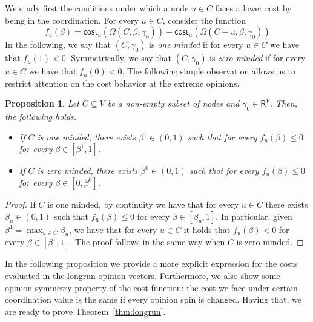 \documentclass[letterpaper,11pt]{article}
\newcommand{\RR}{\mathsf{R}}
\newcommand{\cost}{\mathsf{cost}}
\newtheorem{proposition}{Proposition}
\begin{document}
We study first the conditions under which a node $u\in C$ faces a lower cost by being in the coordination.
For every $u\in C$, consider the function 
\begin{equation*}
f_u(\beta)=\cost_u(\Omega(C,\beta,\gamma_0))- \cost_u(\Omega(C-u,\beta,\gamma_0))
\end{equation*}
In the following, we say that $(C,\gamma_0)$ is {\it one minded} if for every $u\in C$ we have that $f_u(1)<0$.
Symmetrically, we say that $(C,\gamma_0)$ is {\it zero minded} if for every $u\in C$ we have that $f_u(0)<0$.
The following simple observation allows us to restrict attention on the cost behavior at the extreme opinions.
\begin{proposition}
\label{prop:minded}
Let $C\subseteq V$ be a non-empty subset of nodes and $\gamma_0\in \RR^V$.
Then, the following holds.
\begin{itemize}
	\item[$(a)$] If $C$ is one minded, there exists $\beta^{1}\in (0,1)$ such that for every $f_u(\beta)\le 0$ for every $\beta\in [\beta^1,1]$.
	\item[$(b)$] If $C$ is zero minded, there exists $\beta^{0}\in (0,1)$ such that for every $f_u(\beta)\le 0$ for every $\beta\in [0,\beta^0]$.
\end{itemize}
\end{proposition}

\begin{proof}
If $C$ is one minded, by continuity we have that for every $u\in C$ there exists $\beta_u\in (0,1)$ such that $f_u(\beta)\le 0$ for every $\beta\in [\beta_u,1]$. 
In particular, given $\beta^1=\max_{u\in C}\beta_u$, we have that for every $u\in C$ it holds that $f_u(\beta)<0$ for every $\beta\in [\beta^1,1]$.
The proof follows in the same way when $C$ is zero minded.
\end{proof}

In the following proposition we provide a more explicit expression for the costs evaluated in the longrun opinion vectors.
Furthermore, we also show some opinion symmetry property of the cost function: the cost we face under certain coordination value is the same if every opinion spin is changed. 
Having that, we are ready to prove Theorem~\ref{thm:longrun}.
\end{document}
